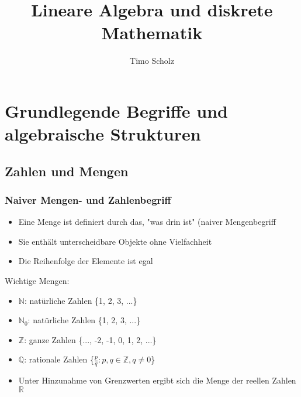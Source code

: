 \documentclass{article}
\title{Lineare Algebra und diskrete Mathematik}
\author{Timo Scholz}
\begin{document}
	\maketitle
	\newpage
	\tableofcontents
	\newpage
	\section{Grundlegende Begriffe und algebraische Strukturen}
	\subsection{Zahlen und Mengen}
	\subsubsection{Naiver Mengen- und Zahlenbegriff}
	\begin{itemize}
	\item Eine Menge ist definiert durch das, "was drin ist" (naiver Mengenbegriff
	\item Sie enthält unterscheidbare Objekte ohne Vielfachheit
	\item Die Reihenfolge der Elemente ist egal
	\end{itemize}
	Wichtige Mengen:
	\begin{itemize}
	\item $\mathbb{N}$: natürliche Zahlen \{1, 2, 3, ...\}
	\item $\mathbb{N}_{0}$: natürliche Zahlen \{1, 2, 3, ...\}
	\item $\mathbb{Z}$: ganze Zahlen \{..., -2, -1, 0, 1, 2, ...\}
	\item $\mathbb{Q}$: rationale Zahlen \{$\frac{p}{q}: p,q \in \mathbb{Z}, q \neq 0$\} 
	\item Unter Hinzunahme von Grenzwerten ergibt sich die Menge der reellen Zahlen $\mathbb{R}$
	\end{itemize}
	
\end{document}
